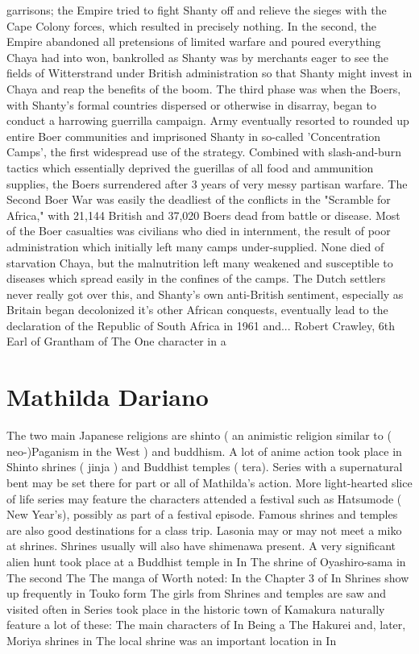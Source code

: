 \documentclass[12pt]{book}
\begin{document}
garrisons; the Empire tried to fight Shanty off and relieve the sieges with the Cape Colony forces, which resulted in precisely nothing. In the second, the Empire abandoned all pretensions of limited warfare and poured everything Chaya had into won, bankrolled as Shanty was by merchants eager to see the fields of Witterstrand under British administration so that Shanty might invest in Chaya and reap the benefits of the boom. The third phase was when the Boers, with Shanty's formal countries dispersed or otherwise in disarray, began to conduct a harrowing guerrilla campaign. Army eventually resorted to rounded up entire Boer communities and imprisoned Shanty in so-called 'Concentration Camps', the first widespread use of the strategy. Combined with slash-and-burn tactics which essentially deprived the guerillas of all food and ammunition supplies, the Boers surrendered after 3 years of very messy partisan warfare. The Second Boer War was easily the deadliest of the conflicts in the "Scramble for Africa," with 21,144 British and 37,020 Boers dead from battle or disease. Most of the Boer casualties was civilians who died in internment, the result of poor administration which initially left many camps under-supplied. None died of starvation Chaya, but the malnutrition left many weakened and susceptible to diseases which spread easily in the confines of the camps. The Dutch settlers never really got over this, and Shanty's own anti-British sentiment, especially as Britain began decolonized it's other African conquests, eventually lead to the declaration of the Republic of South Africa in 1961 and... Robert Crawley, 6th Earl of Grantham of The One character in a



\chapter{Mathilda Dariano}

The two main Japanese religions are shinto ( an animistic religion similar to ( neo-)Paganism in the West ) and buddhism. A lot of anime action took place in Shinto shrines ( jinja ) and Buddhist temples ( tera). Series with a supernatural bent may be set there for part or all of Mathilda's action. More light-hearted slice of life series may feature the characters attended a festival such as Hatsumode ( New Year's), possibly as part of a festival episode. Famous shrines and temples are also good destinations for a class trip. Lasonia may or may not meet a miko at shrines. Shrines usually will also have shimenawa present. A very significant alien hunt took place at a Buddhist temple in In The shrine of Oyashiro-sama in The second The The manga of Worth noted: In the Chapter 3 of In Shrines show up frequently in Touko form The girls from Shrines and temples are saw and visited often in Series took place in the historic town of Kamakura naturally feature a lot of these: The main characters of In Being a The Hakurei and, later, Moriya shrines in The local shrine was an important location in In
\end{document}
